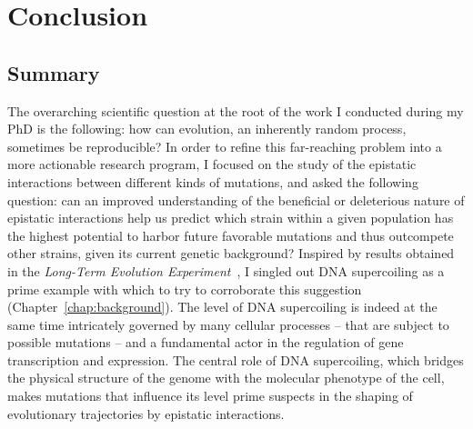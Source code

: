 \chapter{Conclusion}
\label{chap:conclusion}

\section{Summary}

The overarching scientific question at the root of the work I conducted during my PhD is the following: how can evolution, an inherently random process, sometimes be reproducible?
In order to refine this far-reaching problem into a more actionable research program, I focused on the study of the epistatic interactions between different kinds of mutations, and asked the following question: can an improved understanding of the beneficial or deleterious nature of epistatic interactions help us predict which strain within a given population has the highest potential to harbor future favorable mutations and thus outcompete other strains, given its current genetic background?
Inspired by results obtained in the \emph{Long-Term Evolution Experiment}~\citep{lenski1991}, I singled out DNA supercoiling as a prime example with which to try to corroborate this suggestion (Chapter~\ref{chap:background}).
The level of DNA supercoiling is indeed at the same time intricately governed by many cellular processes -- that are subject to possible mutations -- and a fundamental actor in the regulation of gene transcription and expression.
The central role of DNA supercoiling, which bridges the physical structure of the genome with the molecular phenotype of the cell, makes mutations that influence its level prime suspects in the shaping of evolutionary trajectories by epistatic interactions.

